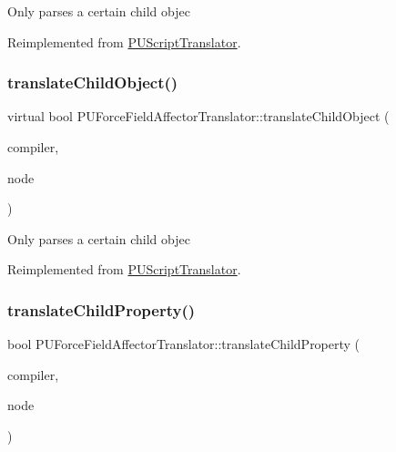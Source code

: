 Only parses a certain child objec 

Reimplemented from \hyperlink{classPUScriptTranslator_ab587d01348ae3e678cb700c719b2b113}{P\+U\+Script\+Translator}.

\mbox{\label{classPUForceFieldAffectorTranslator_aba702f56eed25b88fd27ffc1bf813c80}} 
\subsubsection{\texorpdfstring{translate\+Child\+Object()}{translateChildObject()}\hspace{0.1cm}{\footnotesize\ttfamily [2/2]}}
{\footnotesize\ttfamily virtual bool P\+U\+Force\+Field\+Affector\+Translator\+::translate\+Child\+Object (\begin{DoxyParamCaption}\item[{\hyperlink{classPUScriptCompiler}{P\+U\+Script\+Compiler} $\ast$}]{compiler,  }\item[{\hyperlink{classPUAbstractNode}{P\+U\+Abstract\+Node} $\ast$}]{node }\end{DoxyParamCaption})\hspace{0.3cm}{\ttfamily [virtual]}}

Only parses a certain child objec 

Reimplemented from \hyperlink{classPUScriptTranslator_ab587d01348ae3e678cb700c719b2b113}{P\+U\+Script\+Translator}.

\mbox{\label{classPUForceFieldAffectorTranslator_af3d48aa10615a215967a66e0e0f61de2}} 
\subsubsection{\texorpdfstring{translate\+Child\+Property()}{translateChildProperty()}\hspace{0.1cm}{\footnotesize\ttfamily [1/2]}}
{\footnotesize\ttfamily bool P\+U\+Force\+Field\+Affector\+Translator\+::translate\+Child\+Property (\begin{DoxyParamCaption}\item[{\hyperlink{classPUScriptCompiler}{P\+U\+Script\+Compiler} $\ast$}]{compiler,  }\item[{\hyperlink{classPUAbstractNode}{P\+U\+Abstract\+Node} $\ast$}]{node }\end{DoxyParamCaption})\hspace{0.3cm}{\ttfamily [virtual]}}

